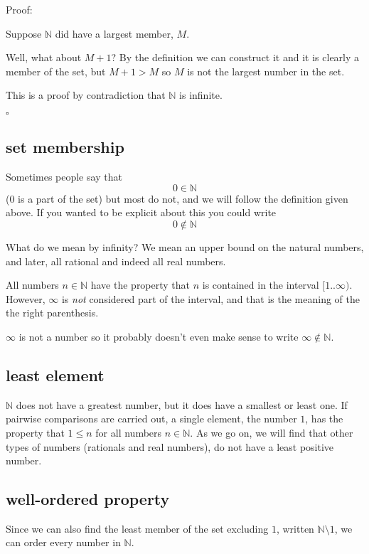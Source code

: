 \documentclass[11pt, oneside]{article}
\begin{document}
Proof:  

Suppose $\mathbb{N}$ did have a largest member, $M$.  

Well, what about $M + 1$?  By the definition we can construct it and it is clearly a member of the set, but $M + 1 > M$ so $M$ is not the largest number in the set.

This is a proof by contradiction that $\mathbb{N}$ is infinite.

$\square$

\subsection*{set membership}

Sometimes people say that
\[ 0 \in \mathbb{N} \]
(0 is a part of the set) but most do not, and we will follow the definition given above.  If you wanted to be explicit about this you could write
\[ 0 \notin \mathbb{N} \]

What do we mean by infinity?  We mean an upper bound on the natural numbers, and later, all rational and indeed all real numbers.  

All numbers $n \in \mathbb{N}$ have the property that $n$ is contained in the interval $[1..\infty)$.  However, $\infty$ is \emph{not} considered part of the interval, and that is the meaning of the the right parenthesis.

$\infty$ is not a number so it probably doesn't even make sense to write $\infty \notin \mathbb{N}$.

\subsection*{least element}

$\mathbb{N}$ does not have a greatest number, but it does have a smallest or least one.  If pairwise comparisons are carried out, a single element, the number $1$, has the property that $1 \le n$ for all numbers $n \in \mathbb{N}$.  As we go on, we will find that other types of numbers (rationals and real numbers), do not have a least positive number.

\subsection*{well-ordered property}

Since we can also find the least member of the set excluding $1$, written $\mathbb{N} \setminus 1$, we can order every number in $\mathbb{N}$.  
\end{document}
